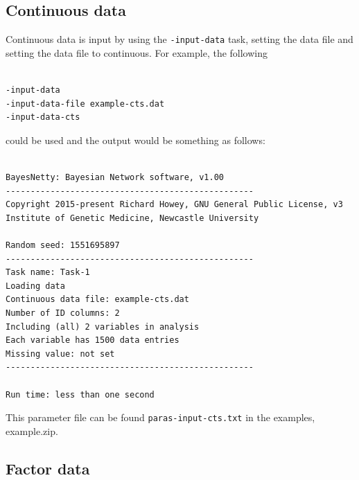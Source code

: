 \documentclass[a4paper,12pt]{article}
\newcommand{\code}[1]{{\footnotesize{{\tt #1}}}}
\begin{document}

\subsection{Continuous data}
\label{input-data-cts}

Continuous data is input by using the \code{-input-data} task, setting the data file and setting the data file to continuous. For example, the following 
\vspace{0.35cm} \begin{lstlisting}

-input-data
-input-data-file example-cts.dat
-input-data-cts

\end{lstlisting} \vspace{0.35cm}
could be used and the output would be something as follows: 
\vspace{0.35cm} \begin{lstlisting}

BayesNetty: Bayesian Network software, v1.00
--------------------------------------------------
Copyright 2015-present Richard Howey, GNU General Public License, v3
Institute of Genetic Medicine, Newcastle University

Random seed: 1551695897
--------------------------------------------------
Task name: Task-1
Loading data
Continuous data file: example-cts.dat
Number of ID columns: 2
Including (all) 2 variables in analysis
Each variable has 1500 data entries
Missing value: not set
--------------------------------------------------

Run time: less than one second

\end{lstlisting} \vspace{0.35cm}
This parameter file can be found \code{paras-input-cts.txt} in the examples, example.zip. 


\subsection{Factor data}
\label{input-data-factor}
\end{document}
